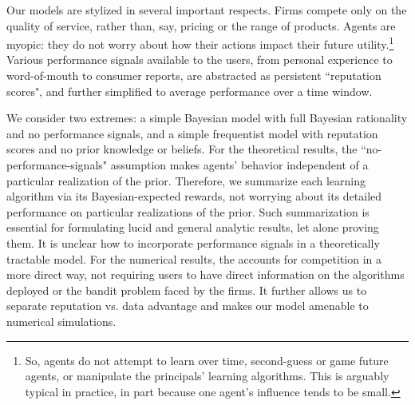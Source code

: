 Our models are stylized in several important  respects. Firms compete only on the quality of service, rather than, say, pricing or the range of products. Agents are myopic: they do not worry about how their actions impact their future utility.\footnote{So, agents do not attempt to learn over time, second-guess or game future agents, or manipulate the principals' learning algorithms. This is arguably typical in practice, in part because one agent's influence tends to be small.}  Various performance signals available to the users, from personal experience to word-of-mouth to consumer reports, are abstracted as persistent ``reputation scores", and further simplified to average performance over a time window. 

We consider two extremes: a simple Bayesian model with full Bayesian rationality and no performance signals, and a simple frequentist model with reputation scores and no prior knowledge or beliefs. For the theoretical results, the ``no-performance-signals" assumption makes agents' behavior independent of a particular realization of the prior. Therefore, we summarize each learning algorithm via its Bayesian-expected rewards, not worrying about its detailed performance on particular realizations of the prior.  Such summarization is essential for formulating lucid and general analytic results, let alone proving them. It is unclear how to incorporate performance signals in a theoretically tractable model. For the numerical results, the \ExptsModel accounts for competition in a more direct way,
not requiring users to have direct information on the algorithms deployed or the bandit problem faced by the firms. It further allows us to separate reputation vs. data advantage and makes our model amenable to numerical simulations. 




